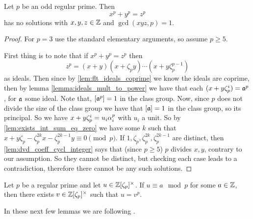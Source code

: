 \begin{theorem}\label{theorem:FLT_case_one}
	\leanok
	Let $p$ be an odd regular prime. Then \[x^p+y^p=z^p\] has no solutions with $x,y,z \in \mathbb{Z}$ and $\gcd(xyz,p)=1$.
\end{theorem}
\begin{proof}
	\leanok
	For $p=3$ use the standard elementary arguments, so assume $p \geq 5$.

	First thing is to note that if $x^p+y^p=z^p$ then \[z^p=(x+y)(x+\zeta_py)\cdots(x+y\zeta_p^{p-1})\] as ideals. Then since by \ref{lem:flt_ideals_coprime} we know the ideals are coprime, then by lemma \ref{lemma:ideals_mult_to_power} we have that each $(x+y\zeta_p^i)=\mathfrak{a}^p$, for $\mathfrak{a}$ some ideal. Note that, $[\mathfrak{a}^p]=1$ in the class group. Now, since $p$ does not divide the size of the class group we have that $[\mathfrak{a}]=1$ in the class group, so its principal. So we have $x+y\zeta_p^i=u_i\alpha_i^p$ with $u_i$ a unit. So by \ref{lem:exists_int_sum_eq_zero} we have some $k$ such that $x+y\zeta_p-\zeta_p^{2k}x-\zeta_p^{2k-1}y \equiv 0 \pmod p$. If $1,\zeta_p,\zeta_p^{2k},\zeta_p^{2k-1}$ are distinct, then \ref{lem:dvd_coeff_cycl_integer} says that (since $p \geq 5$) $p$  divides $x,y$, contrary to our assumption. So they cannot be distinct, but checking each case leads to a contradiction, therefore there cannot be any such solutions.
\end{proof}

\begin{theorem}\label{thm:Kummers_lemma}
	\leanok
	Let $p$ be a regular prime and let $u \in \mathbb{Z}[\zeta_p]^\times$. If $u \equiv a \mod p$ for some $a \in \mathbb{Z}$, then there exists $v \in \mathbb{Z}[\zeta_p]^\times$ such that $u=v^p$.
\end{theorem}

In these next few lemmas we are following \cite{Borevich_Shafarevich}.

